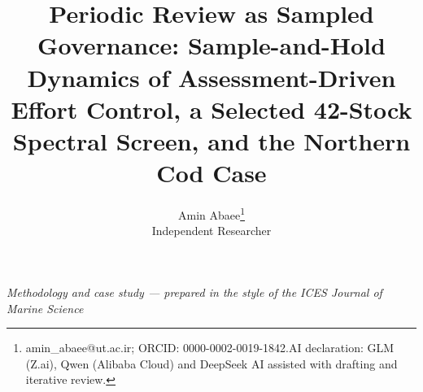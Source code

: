 \documentclass[11pt]{article}
\begin{document}
\title{Periodic Review as Sampled Governance: Sample-and-Hold Dynamics of Assessment-Driven Effort Control, a Selected 42-Stock Spectral Screen, and the Northern Cod Case}
\author{Amin Abaee\thanks{amin\_abaee@ut.ac.ir; ORCID: 0000-0002-0019-1842.\newline AI declaration: GLM (Z.ai), Qwen (Alibaba Cloud) and DeepSeek AI assisted with drafting and iterative review.} \\ Independent Researcher}
\date{}
\maketitle

{\centering\small \emph{Methodology and case study --- prepared in the style of the ICES
Journal of Marine Science}\par}
\end{document}
